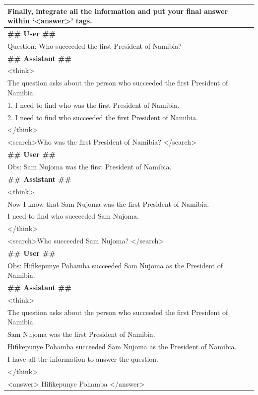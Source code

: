 \begin{table}[h!]
{\begin{tabular}{p{\textwidth}}
Finally, integrate all the information and put your final answer within `\textless answer\textgreater ' tags. \\
\midrule
\textbf{\#\# User \#\#} \\
Question: Who succeeded the first President of Namibia? \\
\midrule
\textbf{\#\# Assistant \#\#} \\
\textless think\textgreater \\
The question asks about the person who succeeded the first President of Namibia. \\
1. I need to find who was the first President of Namibia. \\
2. I need to find who succeeded the first President of Namibia. \\
\textless /think\textgreater \\
\textless search\textgreater Who was the first President of Namibia? \textless /search\textgreater \\
\midrule
\textbf{\#\# User \#\#} \\
Obs: Sam Nujoma was the first President of Namibia. \\
\midrule
\textbf{\#\# Assistant \#\#} \\
\textless think\textgreater \\
Now I know that Sam Nujoma was the first President of Namibia. \\
I need to find who succeeded Sam Nujoma. \\
\textless /think\textgreater \\
\textless search\textgreater Who succeeded Sam Nujoma? \textless /search\textgreater \\
\midrule
\textbf{\#\# User \#\#} \\
Obs: Hifikepunye Pohamba succeeded Sam Nujoma as the President of Namibia. \\
\midrule
\textbf{\#\# Assistant \#\#} \\
\textless think\textgreater \\
The question asks about the person who succeeded the first President of Namibia. \\
Sam Nujoma was the first President of Namibia. \\
Hifikepunye Pohamba succeeded Sam Nujoma as the President of Namibia. \\
I have all the information to answer the question. \\
\textless /think\textgreater \\
\textless answer\textgreater 
Hifikepunye Pohamba 
\textless /answer\textgreater \\
\bottomrule
\end{tabular}
}
\label{planner_text}
\end{table}

